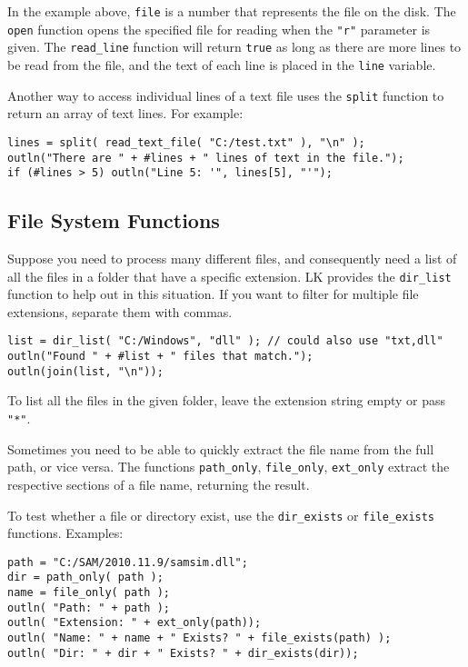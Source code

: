 \documentclass{article}
\begin{document}
In the example above, \texttt{file} is a number that represents the file on the disk.  The \texttt{open} function opens the specified file for reading when the \texttt{"r"} parameter is given.  The \texttt{read\_line} function will return \texttt{true} as long as there are more lines to be read from the file, and the text of each line is placed in the \texttt{line} variable.

Another way to access individual lines of a text file uses the \texttt{split} function to return an array of text lines.  For example:

\begin{verbatim}
lines = split( read_text_file( "C:/test.txt" ), "\n" );
outln("There are " + #lines + " lines of text in the file.");
if (#lines > 5) outln("Line 5: '", lines[5], "'");
\end{verbatim}

\subsection{File System Functions}

Suppose you need to process many different files, and consequently need a list of all the files in a folder that have a specific extension.  LK provides the \texttt{dir\_list} function to help out in this situation.  If you want to filter for multiple file extensions, separate them with commas.

\begin{verbatim}
list = dir_list( "C:/Windows", "dll" ); // could also use "txt,dll"
outln("Found " + #list + " files that match.");
outln(join(list, "\n"));
\end{verbatim}

To list all the files in the given folder, leave the extension string empty or pass \texttt{"*"}.

Sometimes you need to be able to quickly extract the file name from the full path, or vice versa.  The functions \texttt{path\_only}, \texttt{file\_only}, \texttt{ext\_only} extract the respective sections of a file name, returning the result.

To test whether a file or directory exist, use the \texttt{dir\_exists} or \texttt{file\_exists} functions.  Examples:

\begin{verbatim}
path = "C:/SAM/2010.11.9/samsim.dll";
dir = path_only( path );
name = file_only( path );
outln( "Path: " + path );
outln( "Extension: " + ext_only(path));
outln( "Name: " + name + " Exists? " + file_exists(path) );
outln( "Dir: " + dir + " Exists? " + dir_exists(dir));
\end{verbatim}
\end{document}
